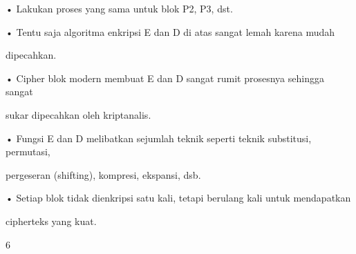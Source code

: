 \documentclass{article}
\begin{document}

• Lakukan proses yang sama untuk blok P2, P3, dst.

• Tentu saja algoritma enkripsi E dan D di atas sangat lemah karena mudah 

dipecahkan.

• Cipher blok modern membuat E dan D sangat rumit prosesnya sehingga sangat 

sukar dipecahkan oleh kriptanalis.

• Fungsi E dan D melibatkan sejumlah teknik seperti teknik substitusi, permutasi, 

pergeseran (shifting), kompresi, ekspansi, dsb.

• Setiap blok tidak dienkripsi satu kali, tetapi berulang kali untuk mendapatkan 

cipherteks yang kuat.

6
\end{document}
